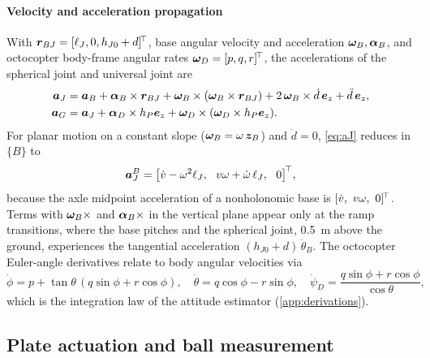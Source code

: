 \paragraph{Velocity and acceleration propagation}
With $\bm{r}_{BJ}=[\ell_J,0,h_{J0}+d]^{\!\top}$, base angular velocity and acceleration $\bm{\omega}_B,\bm{\alpha}_B$, and octocopter body-frame angular rates $\bm{\omega}_D=[p,q,r]^{\!\top}$, the accelerations of the spherical joint and universal joint are
\begin{align}
  \bm{a}_J&=\bm{a}_B+\bm{\alpha}_B\times\bm{r}_{BJ}+\bm{\omega}_B\times(\bm{\omega}_B\times\bm{r}_{BJ})+2\,\bm{\omega}_B\times\dot d\,\bm{e}_z+\ddot d\,\bm{e}_z, \label{eq:aJ}\\
  \bm{a}_G&=\bm{a}_J+\bm{\alpha}_D\times h_P\bm{e}_z+\bm{\omega}_D\times(\bm{\omega}_D\times h_P\bm{e}_z). \label{eq:aG}
\end{align}
For planar motion on a constant slope ($\bm{\omega}_B=\omega\,\bm{z}_B$) and $\ddot d=0$, \eqref{eq:aJ} reduces in $\{B\}$ to
\begin{equation}
  \bm{a}_J^{B}=\big[\dot v-\omega^2\ell_J,\ \ v\omega+\dot\omega\,\ell_J,\ \ 0\big]^{\!\top} ,
  \label{eq:aJplanar}
\end{equation}
because the axle midpoint acceleration of a nonholonomic base is $[\dot v,\ v\omega,\ 0]\T$. Terms with $\bm{\omega}_B\times$ and $\bm{\alpha}_B\times$ in the vertical plane appear only at the ramp transitions, where the base pitches and the spherical joint, \SI{0.5}{\metre} above the ground, experiences the tangential acceleration $(h_{J0}+d)\,\ddot\theta_B$. The octocopter Euler-angle derivatives relate to body angular velocities via
\begin{equation}
  \dot\phi=p+\tan\theta\,(q\sin\phi+r\cos\phi),\quad \dot\theta=q\cos\phi-r\sin\phi,\quad \dot\psi_D=\frac{q\sin\phi+r\cos\phi}{\cos\theta},
  \label{eq:euler_rates}
\end{equation}
which is the integration law of the attitude estimator (\ref{app:derivations}).

\subsection{Plate actuation and ball measurement}
\label{sec:linkage}

